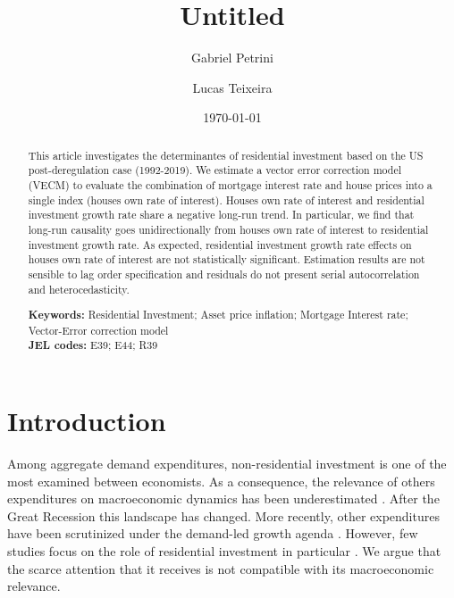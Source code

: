 \documentclass[12pt, a4paper]{article}
\author[1]{Gabriel Petrini}
\affil[1]{PhD Student at University of Campinas (Brazil), Email: \url{gpetrinidasilveira@gmail.com}} %
\author[2]{Lucas Teixeira}
\affil[2]{Assistant Professor at University of Campinas (Brazil), Email: \url{lucastei@unicamp.br}} %
\date{\today}
\title{Untitled}
\begin{document}
\maketitle



\begin{abstract}
This article investigates the determinantes of residential investment based on the US post-deregulation case (1992-2019).
We estimate a vector error correction model (VECM) to evaluate the combination of mortgage interest rate and house prices  into a single index (houses own rate of interest).
Houses own rate of interest and residential investment growth rate share a negative long-run trend.
In particular, we find that long-run causality goes unidirectionally from houses own rate of interest to residential investment growth rate.
As expected, residential investment growth rate effects on houses own rate of interest are not statistically significant.
Estimation results are not sensible to lag order specification and residuals do not present serial autocorrelation and heterocedasticity.

\noindent \textbf{Keywords:} Residential Investment; Asset price inflation; Mortgage Interest rate; Vector-Error correction model\\
\noindent \textbf{JEL codes:} E39; E44; R39
\end{abstract}


\section{Introduction}
\label{sec:org68a3e40}
\label{sec:Introduction}
Among aggregate demand expenditures, non-residential investment is one of the most examined between economists.
As a consequence, the relevance of others expenditures on macroeconomic dynamics has been underestimated \cite{brochier_macroeconomics_2017}.
After the Great Recession this landscape has changed.
More recently, other expenditures have been scrutinized under the demand-led growth agenda \cites{freitas_pattern_2013}{girardi_long-run_2016}{girardi_autonomous_2018}{braga_investment_2018}.
However, few studies focus on the role of residential investment in particular \cite{petrini_2021_TD}.
We argue that the scarce attention that it receives is not compatible with its macroeconomic relevance.
\end{document}
